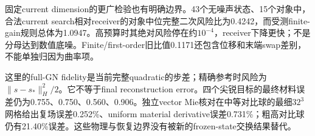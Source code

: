 固定current dimension的更广检验也有明确边界。43个无噪声状态、15个对象中，合法current search相对receiver的对象中位完整二次风险比为0.4242，而受测finite-gain规则总体为1.0947。高预算时其绝对风险停在约$10^{-4}$，receiver下降更快；不是分母达到数值底噪。Finite/first-order旧比值0.1171还包含位移和末端swap差别，不能单独归因为曲率项。

这里的full-GN fidelity是当前完整quadratic的步差；精确参考时风险为$\|s-s_*\|_H^2/2$。它不等于final reconstruction error。四个尖锐目标的最终材料误差仍为0.755、0.750、0.560、0.906。独立vector Mie核对在中等对比球的最细$32^3$网格给出复场误差0.252\%、uniform material derivative误差0.731\%；粗高对比球仍有21.40\%误差。这些物理与恢复边界没有被新的frozen-state交换结果替代。
